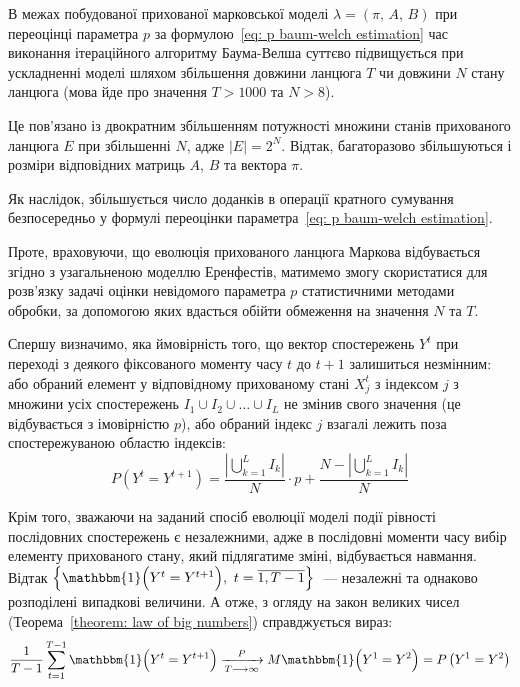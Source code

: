 В межах побудованої прихованої марковської моделі $\lambda=(\pi,\,A,\,B)$ при переоцінці параметра $p$ за формулою~\eqref{eq: p baum-welch estimation} час виконання ітераційного алгоритму Баума-Велша суттєво підвищується при ускладненні моделі шляхом збільшення довжини ланцюга $T$ чи довжини $N$ стану ланцюга (мова йде про значення $T>1000$ та $N>8$). 

Це пов'язано із двократним збільшенням потужності множини станів прихованого ланцюга $E$ при збільшенні $N$, адже $|E|=2^N$. Відтак, багаторазово збільшуються і розміри відповідних матриць $A$, $B$ та вектора $\pi$. 

Як наслідок, збільшується число доданків в операції кратного сумування безпосередньо у формулі переоцінки параметра~\eqref{eq: p baum-welch estimation}.

Проте, враховуючи, що еволюція прихованого ланцюга Маркова відбувається згідно з узагальненою моделлю Еренфестів, матимемо змогу скористатися для розв'язку задачі оцінки невідомого параметра $p$ статистичними методами обробки, за допомогою яких вдасться обійти обмеження на значення $N$ та $T$.

Спершу визначимо, яка ймовірність того, що вектор спостережень $Y^t$ при переході з деякого фіксованого моменту часу $t$ до $t+1$ залишиться незмінним: або обраний елемент у відповідному прихованому стані $X^t_j$ з індексом $j$ з множини усіх спостережень $I_1 \cup I_2 \cup \ldots \cup I_L$ не змінив свого значення (це відбувається з імовірністю $p$), або обраний індекс $j$ взагалі лежить поза спостережуваною областю індексів:
\begin{equation}\label{eq: equality of successive observations}
    P\left( Y^t=Y^{t+1} \right) = \frac{\left| \bigcup\limits_{k=1}^{L}I_k \right|}{N}\cdot p + \frac{N-\left| \bigcup\limits_{k=1}^{L}I_k \right|}{N}
\end{equation}

Крім того, зважаючи на заданий спосіб еволюції моделі події рівності послідовних спостережень є незалежними, адже в послідовні моменти часу вибір елементу прихованого стану, який підлягатиме зміні, відбувається навмання. Відтак $\left\{ \mathbbm{1} \Bigl( Y^t=Y^{t+1} \Bigr),\ t=\overline{1,T-1} \right\}$~--- незалежні та однаково розподілені випадкові величини. А отже, з огляду на закон великих чисел (Теорема~\ref{theorem: law of big numbers}) справджується вираз:
\begin{equation}\label{eq: LBN parameter p}
    \frac{1}{T-1}\sum_{t=1}^{T-1}\mathbbm{1} \Bigl( Y^t=Y^{t+1} \Bigr) \xrightarrow[T \longrightarrow \infty]{P} M\mathbbm{1} \Bigl( Y^1=Y^2 \Bigr) = P\left( Y^1=Y^2 \right)
\end{equation}

